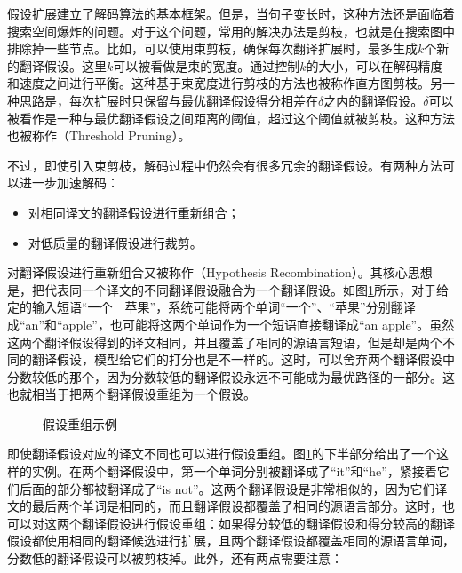 \parinterval 假设扩展建立了解码算法的基本框架。但是，当句子变长时，这种方法还是面临着搜索空间爆炸的问题。对于这个问题，常用的解决办法是剪枝，也就是在搜索图中排除掉一些节点。比如，可以使用束剪枝，确保每次翻译扩展时，最多生成$k$个新的翻译假设。这里$k$可以被看做是束的宽度。通过控制$k$的大小，可以在解码精度和速度之间进行平衡。这种基于束宽度进行剪枝的方法也被称作直方图剪枝。另一种思路是，每次扩展时只保留与最优翻译假设得分相差在$\delta$之内的翻译假设。$\delta$可以被看作是一种与最优翻译假设之间距离的阈值，超过这个阈值就被剪枝。这种方法也被称作{\small{}}（Threshold Pruning）。

\parinterval 不过，即使引入束剪枝，解码过程中仍然会有很多冗余的翻译假设。有两种方法可以进一步加速解码：

\begin{itemize}
\vspace{0.5em}
\item 对相同译文的翻译假设进行重新组合；
\vspace{0.5em}
\item 对低质量的翻译假设进行裁剪。
\vspace{0.5em}
\end{itemize}

\parinterval 对翻译假设进行重新组合又被称作{\small{}}（Hypothesis Recombination）。其核心思想是，把代表同一个译文的不同翻译假设融合为一个翻译假设。如图\ref{fig:7-26}所示，对于给定的输入短语“一个\ \ 苹果”，系统可能将两个单词“一个”、“苹果”分别翻译成“an”和“apple”，也可能将这两个单词作为一个短语直接翻译成“an apple”。虽然这两个翻译假设得到的译文相同，并且覆盖了相同的源语言短语，但是却是两个不同的翻译假设，模型给它们的打分也是不一样的。这时，可以舍弃两个翻译假设中分数较低的那个，因为分数较低的翻译假设永远不可能成为最优路径的一部分。这也就相当于把两个翻译假设重组为一个假设。

\begin{figure}[htp]
\centering

\caption{假设重组示例}
\label{fig:7-26}
\end{figure}

\parinterval 即使翻译假设对应的译文不同也可以进行假设重组。图\ref{fig:7-26}的下半部分给出了一个这样的实例。在两个翻译假设中，第一个单词分别被翻译成了“it”和“he”，紧接着它们后面的部分都被翻译成了“is not”。这两个翻译假设是非常相似的，因为它们译文的最后两个单词是相同的，而且翻译假设都覆盖了相同的源语言部分。这时，也可以对这两个翻译假设进行假设重组：如果得分较低的翻译假设和得分较高的翻译假设都使用相同的翻译候选进行扩展，且两个翻译假设都覆盖相同的源语言单词，分数低的翻译假设可以被剪枝掉。此外，还有两点需要注意：

